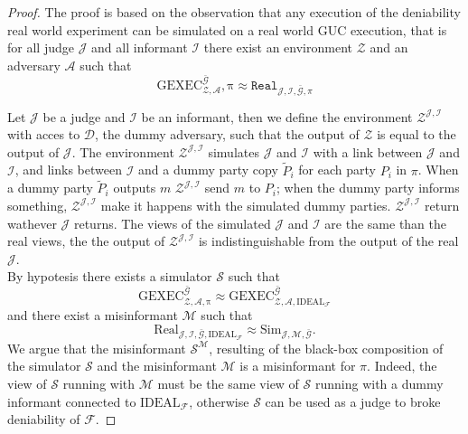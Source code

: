 \documentclass{acm_proc_article-sp}
\begin{document}
\begin{proof}
The proof is based on the observation that any execution of the deniability real world experiment
can be simulated on a real world GUC execution, that is for all judge
$\mathcal{J}$ and all informant $\mathcal{I}$ there exist an environment $\mathcal{Z}$ and an adversary
$\mathcal{A}$ such that
$$
\mathrm{
    GEXEC
    ^{
        \bar{\mathcal{G}}
    }
    _{
        \mathcal{Z},
        \mathcal{A}},
        \pi
    }
\approx
\mathtt{Real}_{\mathcal{J, I,\bar{G}},\pi}
$$

Let $\mathcal{J}$ be a judge and $\mathcal{I}$ be an informant, then we define the environment
$\mathcal{Z^{J,I}}$ with acces to $\mathcal{D}$, the dummy adversary, such that the output of $\mathcal{Z}$
is equal to the output of $\mathcal{J}$.
The environment $\mathcal{Z^{J,I}}$ simulates $\mathcal{J}$ and $\mathcal{I}$
with a link between $\mathcal{J}$ and $\mathcal{I}$, and links between $\mathcal{I}$ and a dummy party copy
$\tilde{P}_i$ for each party $P_i$ in $\pi$.
When a dummy party $\tilde{P}_i$ outputs $m$
$\mathcal{Z^{J,I}}$ send $m$ to $P_i$; when the dummy party informs something, $\mathcal{Z^{J,I}}$ make it happens
with the simulated dummy parties. $\mathcal{Z^{J,I}}$ return wathever $\mathcal{J}$ returns. The views of the simulated
$\mathcal{J}$ and $\mathcal{I}$ are the same than the real views, the the output of $\mathcal{Z^{J,I}}$ is
indistinguishable from the output of the real $\mathcal{J}$.\\
By hypotesis there exists a simulator $\mathcal{S}$ such that
$$
\mathrm
{
    GEXEC
    ^{
        \bar{\mathcal{G}}
     }
    _{
        \mathcal{Z},
        \mathcal{A},
        \pi
     }
}
\approx
\mathrm
{
    GEXEC
    ^{
        \bar{\mathcal{G}}
     }
    _{
        \mathcal{Z},
        \mathcal{A},
        \mathrm{IDEAL}_\mathcal{F}
     }
}
$$
and there exist a misinformant $\mathcal{M}$ such that
$$
\mathrm{Real}_{\mathcal{J, I,\bar{G}},\mathrm{IDEAL}_\mathcal{F}}
\approx
\mathrm{Sim}_{\mathcal{J, M,\bar{G}}}.
$$
We argue that the misinformant $\mathcal{S^M}$, resulting of the black-box composition of the
simulator $\mathcal{S}$ and the misinformant $\mathcal{M}$ is a misinformant for $\pi$. Indeed,
the view of $\mathcal{S}$ running with $\mathcal{M}$ must be the same view of $\mathcal{S}$
running with a dummy informant connected to $\mathrm{IDEAL}_\mathcal{F}$, otherwise $\mathcal{S}$
can be used as a judge to broke deniability of $\mathcal{F}$. 
\end{proof}
\end{document}
